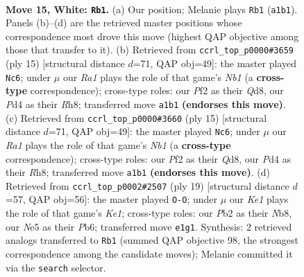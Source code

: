 \documentclass[11pt]{article}
\begin{document}
\clearpage

\begin{figure}[p]\centering
\begin{subfigure}{0.46\textwidth}\centering
\resizebox{\linewidth}{!}{%
\newchessgame
\chessboard[
  setfen={r1b1kb1r/ppq3pp/2p5/3pNp2/3P4/1Q2P3/PP3PPP/R1B1K2R w KQ - 0 15},
  showmover=false,
  pgfstyle=straightmove, color=movearrow, markmove={a1-b1}
]}
\caption{}
\end{subfigure}\hfill
\begin{subfigure}{0.46\textwidth}\centering
\resizebox{\linewidth}{!}{%
\newchessgame
\chessboard[
  setfen={rnbqk2r/pp3ppp/4p3/2Pp4/2P1n3/P7/1PQ1PPPP/R1B1KBNR b KQkq - 0 8},
  showmover=false,
  pgfstyle=straightmove, color=movearrow, markmove={b8-c6}
]}
\caption{}
\end{subfigure}
\\[4pt]
\begin{subfigure}{0.46\textwidth}\centering
\resizebox{\linewidth}{!}{%
\newchessgame
\chessboard[
  setfen={rnbqk2r/pp3ppp/4p3/2Pp4/2P1n3/P7/1PQ1PPPP/R1B1KBNR b KQkq - 0 8},
  showmover=false,
  pgfstyle=straightmove, color=movearrow, markmove={b8-c6}
]}
\caption{}
\end{subfigure}\hfill
\begin{subfigure}{0.46\textwidth}\centering
\resizebox{\linewidth}{!}{%
\newchessgame
\chessboard[
  setfen={rnb1k2r/p4ppp/1p2p3/2Pq4/4n3/P3P3/1PQ2PPP/R1B1KBNR b KQkq - 0 10},
  showmover=false,
  pgfstyle=straightmove, color=movearrow, markmove={e8-g8}
]}
\caption{}
\end{subfigure}
\caption{\textbf{Move 15, White: \texttt{Rb1}.} (a) Our position; Melanie plays \texttt{Rb1} (\texttt{a1b1}). Panels (b)--(d) are the retrieved master positions whose correspondence most drove this move (highest QAP objective among those that transfer to it). (b) Retrieved from \texttt{ccrl\_top\_p0000\#3659} (ply 15) [structural distance $d$=71, QAP obj=49]: the master played \texttt{Nc6}; under $\mu$ our \emph{Ra1} plays the role of that game's \emph{Nb1} (a \textbf{cross-type} correspondence); cross-type roles: our \emph{P}f2 as their \emph{Q}d8, our \emph{P}d4 as their \emph{R}h8; transferred move \texttt{a1b1} \textbf{(endorses this move)}. (c) Retrieved from \texttt{ccrl\_top\_p0000\#3660} (ply 15) [structural distance $d$=71, QAP obj=49]: the master played \texttt{Nc6}; under $\mu$ our \emph{Ra1} plays the role of that game's \emph{Nb1} (a \textbf{cross-type} correspondence); cross-type roles: our \emph{P}f2 as their \emph{Q}d8, our \emph{P}d4 as their \emph{R}h8; transferred move \texttt{a1b1} \textbf{(endorses this move)}. (d) Retrieved from \texttt{ccrl\_top\_p0002\#2507} (ply 19) [structural distance $d$=57, QAP obj=56]: the master played \texttt{O-O}; under $\mu$ our \emph{Ke1} plays the role of that game's \emph{Ke1}; cross-type roles: our \emph{P}b2 as their \emph{N}b8, our \emph{N}e5 as their \emph{P}b6; transferred move \texttt{e1g1}. Synthesis: 2 retrieved analogs transferred to \texttt{Rb1} (summed QAP objective 98, the strongest correspondence among the candidate moves); Melanie committed it via the \texttt{search} selector.}
\label{fig:thought-m28}
\end{figure}
\end{document}
